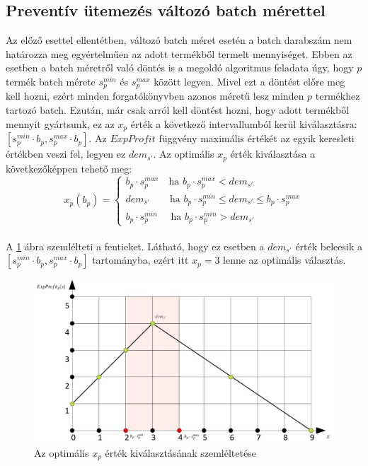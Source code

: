 \subsection{Preventív ütemezés változó batch mérettel} \label{variable_batch_size_modell}
Az előző esettel ellentétben, változó batch méret esetén a batch darabszám nem határozza meg egyértelműen az adott termékből termelt mennyiséget. Ebben az esetben a batch méretről való döntés is a megoldó algoritmus feladata úgy, hogy $p$ termék batch mérete $s_p^{min}$ és $s_p^{max}$ között legyen. Mivel ezt a döntést előre meg kell hozni, ezért minden forgatókönyvben azonos méretű lesz minden $p$ termékhez tartozó batch. Ezután, már csak arról kell döntést hozni, hogy adott termékből mennyit gyártsunk, ez az $x_p$ érték a következő intervallumból kerül kiválasztásra: $[s_p^{min} \cdot b_p , s_p^{max} \cdot b_p]$. Az $ExpProfit$ függvény maximális értékét az egyik keresleti értékben veszi fel, legyen ez $dem_{s'}$. Az optimális $x_p$ érték kiválasztása a következőképpen tehető meg:
\begin{equation*}
x_{p}(b_p)= \begin{cases}
            b_p \cdot s_p^{max} \quad \text{ha } b_p \cdot s_p^{max}<dem_{s'}\\
            dem_{s'} \qquad \text{ha } b_p \cdot s_p^{min} \leq dem_{s'} \leq b_p \cdot s_p^{max}\\
            b_p \cdot s_p^{min} \quad \text{ ha } b_p \cdot s_p^{min}>dem_{s'}
       \end{cases}       
\end{equation*}\\
A \ref{expProfit_func_var} ábra szemlélteti a fentieket. Látható, hogy ez esetben a $dem_{s'}$ érték beleesik a \\$[s_p^{min} \cdot b_p , s_p^{max} \cdot b_p]$ tartományba, ezért itt $x_p=3$ lenne az optimális választás.
\begin{figure}
\begin{center}
\includegraphics[scale=0.4]{expProfit_func_var}
\caption{Az optimális $x_p$ érték kiválasztásának szemléltetése}
\label{expProfit_func_var}
\end{center}
\end{figure}
